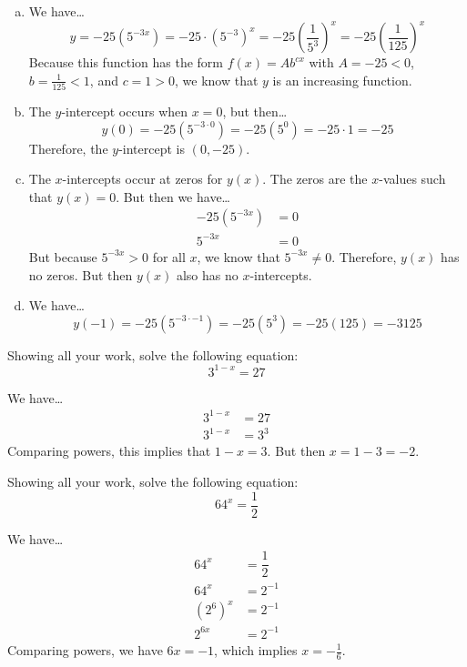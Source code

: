 \documentclass[11pt,letterpaper]{article}
\begin{document}
\sol
\begin{enumerate}[(a)]
\item We have\dots
	\[
	y= -25 (5^{-3x})= -25 \cdot (5^{-3})^x= -25 \left( \dfrac{1}{5^3} \right)^x= -25 \left( \dfrac{1}{125} \right)^x 
	\]
Because this function has the form $f(x)= Ab^{cx}$ with $A= -25 < 0$, $b= \frac{1}{125} < 1$, and $c= 1 > 0$, we know that $y$ is an increasing function. \pspace

\item The $y$-intercept occurs when $x= 0$, but then\dots
	\[
	y(0)= -25(5^{-3 \cdot 0})= -25 (5^0)= -25 \cdot 1= -25
	\]
Therefore, the $y$-intercept is $(0, -25)$. \pspace

\item The $x$-intercepts occur at zeros for $y(x)$. The zeros are the $x$-values such that $y(x)= 0$. But then we have\dots
	\[
	\begin{aligned}
	-25(5^{-3x})&= 0 \\
	5^{-3x}&= 0
	\end{aligned}
	\]
But because $5^{-3x} > 0$ for all $x$, we know that $5^{-3x} \neq 0$. Therefore, $y(x)$ has no zeros. But then $y(x)$ also has no $x$-intercepts. \pspace

\item We have\dots
	\[
	y(-1)= -25(5^{-3 \cdot -1})= -25 (5^3)= -25 (125)= -3125
	\]
\end{enumerate}



\newpage



 Showing all your work, solve the following equation:
	\[
	3^{1 - x}= 27
	\] \pspace

\sol We have\dots
	\[
	\begin{aligned}
	3^{1 - x}&= 27 \\[0.3cm]
	3^{1 - x}&= 3^3
	\end{aligned}
	\]
Comparing powers, this implies that $1 - x= 3$. But then $x= 1 - 3= - 2$. 



\newpage



 Showing all your work, solve the following equation:
	\[
	64^x= \dfrac{1}{2}
	\] \pspace

\sol We have\dots
	\[
	\begin{aligned}
	64^x&= \dfrac{1}{2} \\[0.3cm]
	64^x&= 2^{-1} \\[0.3cm]
	(2^6)^x&= 2^{-1} \\[0.3cm]
	2^{6x}&= 2^{-1}
	\end{aligned}
	\]
Comparing powers, we have $6x= -1$, which implies $x= -\frac{1}{6}$. 
\end{document}
